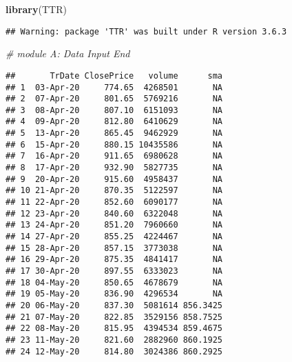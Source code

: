 \documentclass[
]{article}
\newenvironment{Shaded}{\begin{snugshade}}{\end{snugshade}}
\newcommand{\CommentTok}[1]{\textcolor[rgb]{0.56,0.35,0.01}{\textit{#1}}}
\newcommand{\DataTypeTok}[1]{\textcolor[rgb]{0.13,0.29,0.53}{#1}}
\newcommand{\DecValTok}[1]{\textcolor[rgb]{0.00,0.00,0.81}{#1}}
\newcommand{\KeywordTok}[1]{\textcolor[rgb]{0.13,0.29,0.53}{\textbf{#1}}}
\newcommand{\NormalTok}[1]{#1}
\newcommand{\OperatorTok}[1]{\textcolor[rgb]{0.81,0.36,0.00}{\textbf{#1}}}
\begin{document}
\begin{Shaded}
\begin{Highlighting}[]
\KeywordTok{library}\NormalTok{(TTR)}
\end{Highlighting}
\end{Shaded}

\begin{verbatim}
## Warning: package 'TTR' was built under R version 3.6.3
\end{verbatim}

\begin{Shaded}
\begin{Highlighting}[]
\CommentTok{# module A: Data Input End}
\end{Highlighting}
\end{Shaded}

\begin{Shaded}
\end{Shaded}

\begin{verbatim}
##       TrDate ClosePrice   volume      sma
## 1  03-Apr-20     774.65  4268501       NA
## 2  07-Apr-20     801.65  5769216       NA
## 3  08-Apr-20     807.10  6151093       NA
## 4  09-Apr-20     812.80  6410629       NA
## 5  13-Apr-20     865.45  9462929       NA
## 6  15-Apr-20     880.15 10435586       NA
## 7  16-Apr-20     911.65  6980628       NA
## 8  17-Apr-20     932.90  5827735       NA
## 9  20-Apr-20     915.60  4958437       NA
## 10 21-Apr-20     870.35  5122597       NA
## 11 22-Apr-20     852.60  6090177       NA
## 12 23-Apr-20     840.60  6322048       NA
## 13 24-Apr-20     851.20  7960660       NA
## 14 27-Apr-20     855.25  4224467       NA
## 15 28-Apr-20     857.15  3773038       NA
## 16 29-Apr-20     875.35  4841417       NA
## 17 30-Apr-20     897.55  6333023       NA
## 18 04-May-20     850.65  4678679       NA
## 19 05-May-20     836.90  4296534       NA
## 20 06-May-20     837.30  5081614 856.3425
## 21 07-May-20     822.85  3529156 858.7525
## 22 08-May-20     815.95  4394534 859.4675
## 23 11-May-20     821.60  2882960 860.1925
## 24 12-May-20     814.80  3024386 860.2925
\end{verbatim}
\end{document}

